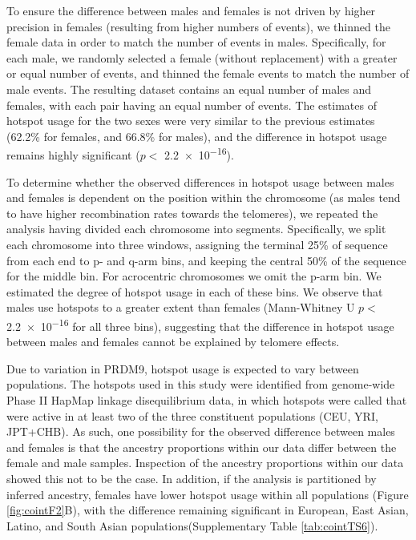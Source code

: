 To ensure the difference between males and females is not driven by higher  
precision in females (resulting from higher numbers of events), we thinned the  
female data in order to match the number of events in males. Specifically, for each  
male, we randomly selected a female (without replacement) with a greater or equal  
number of events, and thinned the female events to match the number of male  
events. The resulting dataset contains an equal number of males and females, with  
each pair having an equal number of events. The estimates of hotspot usage for the  
two sexes were very similar to the previous estimates (62.2\% for females, and  
66.8\% for males), and the difference in hotspot usage remains highly significant  
($p<$ \num{2.2e-16}).  

To determine whether the observed differences in hotspot usage between  
males and females is dependent on the position within the chromosome (as males  
tend to have higher recombination rates towards the telomeres), we repeated the  
analysis having divided each chromosome into segments. Specifically, we split each  
chromosome into three windows, assigning the terminal 25\% of sequence from  
each end to p- and q-arm bins, and keeping the central 50\% of the sequence for the  
middle bin. For acrocentric chromosomes we omit the p-arm bin. We estimated the  
degree of hotspot usage in each of these bins. We observe that males use hotspots to  
a greater extent than females (Mann-Whitney U $p<$ \num{2.2e-16} for all three bins),  
suggesting that the difference in hotspot usage between males and females
cannot be explained by telomere effects.  

Due to variation in PRDM9, hotspot
usage is expected to vary between populations\cite{Hinch2011,Berg2011}. The hotspots used in this
study were identified from genome-wide Phase II HapMap linkage disequilibrium
data\cite{hapmap2007}, in which hotspots were called that were active in at least two of the
three constituent populations (CEU, YRI, JPT+CHB). As such, one possibility for
the observed difference between males and females is that the ancestry
proportions within our data differ between the female and male samples.
Inspection of the ancestry proportions within our data showed this not to be the
case. In addition, if the analysis is partitioned by inferred ancestry,
females have lower hotspot usage within all populations (Figure \ref{fig:cointF2}B), with the
difference remaining significant in European, East Asian, Latino, and South
Asian populations(Supplementary Table \ref{tab:cointTS6}).  

